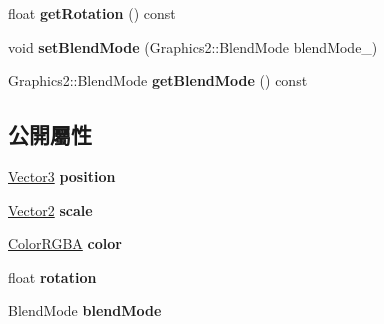 \begin{DoxyCompactItemize}
\item 
float {\bfseries get\+Rotation} () const \hypertarget{class_i_dream_sky_1_1_graphics2_a4d2b915a74bbbe16d791742e5f7bdb4f}{}\label{class_i_dream_sky_1_1_graphics2_a4d2b915a74bbbe16d791742e5f7bdb4f}

\item 
void {\bfseries set\+Blend\+Mode} (Graphics2\+::\+Blend\+Mode blend\+Mode\+\_\+)\hypertarget{class_i_dream_sky_1_1_graphics2_a99d881e73fe1ceb309e0db152e884cb6}{}\label{class_i_dream_sky_1_1_graphics2_a99d881e73fe1ceb309e0db152e884cb6}

\item 
Graphics2\+::\+Blend\+Mode {\bfseries get\+Blend\+Mode} () const \hypertarget{class_i_dream_sky_1_1_graphics2_ae18b7ea97894b285c105455cc5e74a65}{}\label{class_i_dream_sky_1_1_graphics2_ae18b7ea97894b285c105455cc5e74a65}

\end{DoxyCompactItemize}
\subsection*{公開屬性}
\begin{DoxyCompactItemize}
\item 
\hyperlink{class_i_dream_sky_1_1_vector3}{Vector3} {\bfseries position}\hypertarget{class_i_dream_sky_1_1_graphics2_aed1ecc87047ad9363cb18763f3b20724}{}\label{class_i_dream_sky_1_1_graphics2_aed1ecc87047ad9363cb18763f3b20724}

\item 
\hyperlink{class_i_dream_sky_1_1_vector2}{Vector2} {\bfseries scale}\hypertarget{class_i_dream_sky_1_1_graphics2_a0ba0806384706c4b9bb238a37a117a67}{}\label{class_i_dream_sky_1_1_graphics2_a0ba0806384706c4b9bb238a37a117a67}

\item 
\hyperlink{class_i_dream_sky_1_1_color_r_g_b_a}{Color\+R\+G\+BA} {\bfseries color}\hypertarget{class_i_dream_sky_1_1_graphics2_a25e4a8fdf7cf8cc20dcb62017e92a9ab}{}\label{class_i_dream_sky_1_1_graphics2_a25e4a8fdf7cf8cc20dcb62017e92a9ab}

\item 
float {\bfseries rotation}\hypertarget{class_i_dream_sky_1_1_graphics2_a9f49f8c5044a49260f7ef70c13a1daab}{}\label{class_i_dream_sky_1_1_graphics2_a9f49f8c5044a49260f7ef70c13a1daab}

\item 
Blend\+Mode {\bfseries blend\+Mode}\hypertarget{class_i_dream_sky_1_1_graphics2_ac04666b5b9b80576d661696d81d8d306}{}\label{class_i_dream_sky_1_1_graphics2_ac04666b5b9b80576d661696d81d8d306}

\end{DoxyCompactItemize}
